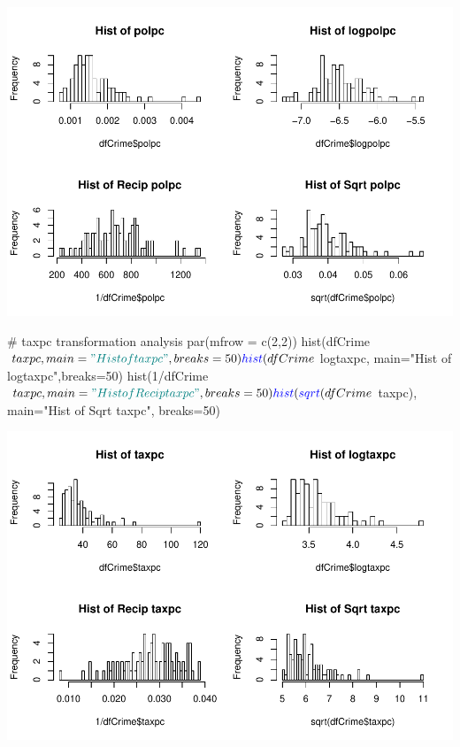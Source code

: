 \documentclass[]{article}
\newenvironment{Shaded}{}{}
\newcommand{\CommentTok}[1]{\textcolor[rgb]{0.00,0.50,0.00}{#1}}
\newcommand{\DataTypeTok}[1]{#1}
\newcommand{\DecValTok}[1]{#1}
\newcommand{\KeywordTok}[1]{\textcolor[rgb]{0.00,0.00,1.00}{#1}}
\newcommand{\NormalTok}[1]{#1}
\newcommand{\OperatorTok}[1]{#1}
\newcommand{\StringTok}[1]{\textcolor[rgb]{0.00,0.50,0.50}{#1}}
\begin{document}
\includegraphics{Bagnard_Gaustad_Hartman_Leung_Lab_3_files/figure-latex/unnamed-chunk-87-1.pdf}

\begin{Shaded}
\begin{Highlighting}[]
\CommentTok{# taxpc transformation analysis }
\KeywordTok{par}\NormalTok{(}\DataTypeTok{mfrow =} \KeywordTok{c}\NormalTok{(}\DecValTok{2}\NormalTok{,}\DecValTok{2}\NormalTok{))}
\KeywordTok{hist}\NormalTok{(dfCrime}\OperatorTok{$}\NormalTok{taxpc, }\DataTypeTok{main=}\StringTok{"Hist of taxpc"}\NormalTok{, }\DataTypeTok{breaks=}\DecValTok{50}\NormalTok{)}
\KeywordTok{hist}\NormalTok{(dfCrime}\OperatorTok{$}\NormalTok{logtaxpc, }\DataTypeTok{main=}\StringTok{"Hist of logtaxpc"}\NormalTok{,}\DataTypeTok{breaks=}\DecValTok{50}\NormalTok{)}
\KeywordTok{hist}\NormalTok{(}\DecValTok{1}\OperatorTok{/}\NormalTok{dfCrime}\OperatorTok{$}\NormalTok{taxpc, }\DataTypeTok{main=}\StringTok{"Hist of Recip taxpc"}\NormalTok{, }\DataTypeTok{breaks=}\DecValTok{50}\NormalTok{)}
\KeywordTok{hist}\NormalTok{(}\KeywordTok{sqrt}\NormalTok{(dfCrime}\OperatorTok{$}\NormalTok{taxpc), }\DataTypeTok{main=}\StringTok{"Hist of Sqrt taxpc"}\NormalTok{, }\DataTypeTok{breaks=}\DecValTok{50}\NormalTok{)}
\end{Highlighting}
\end{Shaded}

\includegraphics{Bagnard_Gaustad_Hartman_Leung_Lab_3_files/figure-latex/unnamed-chunk-88-1.pdf}
\end{document}
